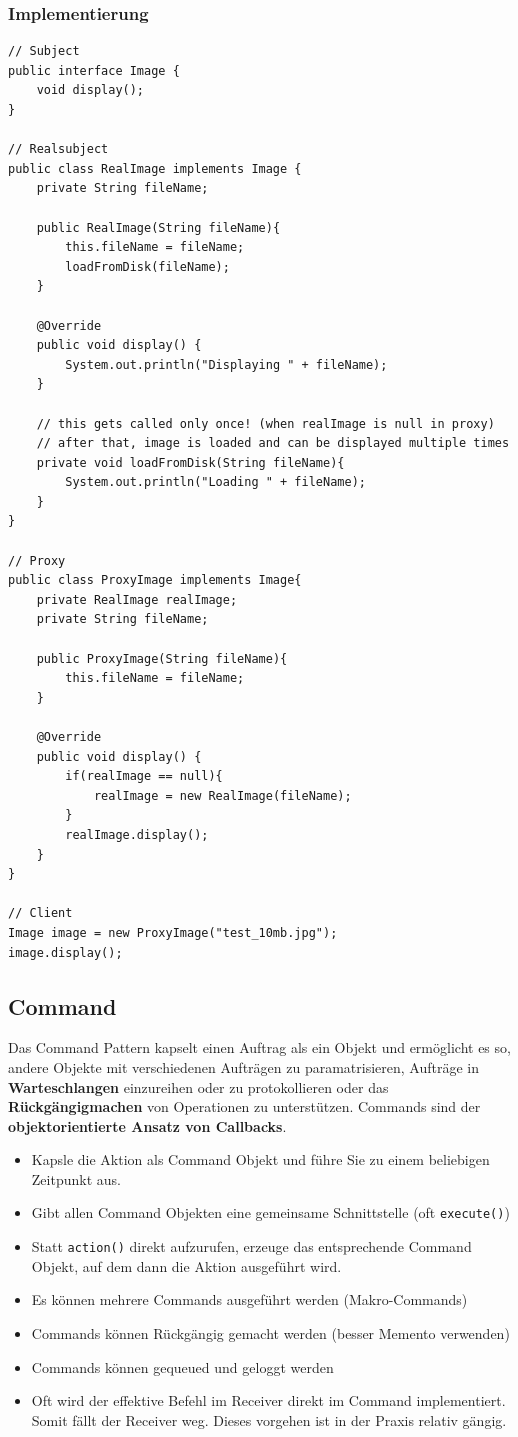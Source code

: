 \subsubsection{Implementierung}
\begin{lstlisting}
// Subject
public interface Image {
	void display();
}

// Realsubject
public class RealImage implements Image {
	private String fileName;
	
	public RealImage(String fileName){
		this.fileName = fileName;
		loadFromDisk(fileName);
	}
	
	@Override
	public void display() {
		System.out.println("Displaying " + fileName);
	}
	
	// this gets called only once! (when realImage is null in proxy)
	// after that, image is loaded and can be displayed multiple times
	private void loadFromDisk(String fileName){
		System.out.println("Loading " + fileName);
	}
}

// Proxy
public class ProxyImage implements Image{
	private RealImage realImage;
	private String fileName;
	
	public ProxyImage(String fileName){
		this.fileName = fileName;
	}
	
	@Override
	public void display() {
		if(realImage == null){
			realImage = new RealImage(fileName);
		}
		realImage.display();
	}
}

// Client
Image image = new ProxyImage("test_10mb.jpg");
image.display(); 
\end{lstlisting}



\clearpage

\subsection{Command}
\label{sec:command}
Das Command Pattern kapselt einen Auftrag als ein Objekt und ermöglicht es so, andere Objekte mit verschiedenen Aufträgen zu paramatrisieren, Aufträge in \textbf{Warteschlangen} einzureihen oder zu protokollieren oder das \textbf{Rückgängigmachen} von Operationen zu unterstützen. Commands sind der \textbf{objektorientierte Ansatz von Callbacks}.
\begin{itemize}
	\item Kapsle die Aktion als Command Objekt und führe Sie zu einem beliebigen Zeitpunkt aus.
	\item Gibt allen Command Objekten eine gemeinsame Schnittstelle (oft \lstinline|execute()|)
	\item Statt \lstinline|action()| direkt aufzurufen, erzeuge das entsprechende Command Objekt, auf dem dann die Aktion ausgeführt wird.
	\item Es können mehrere Commands ausgeführt werden (Makro-Commands) 
	\item Commands können Rückgängig gemacht werden (besser Memento verwenden)
	\item Commands können gequeued und geloggt werden
	\item Oft wird der effektive Befehl im Receiver direkt im Command implementiert. Somit fällt der Receiver weg. Dieses vorgehen ist in der Praxis relativ gängig.
\end{itemize}

